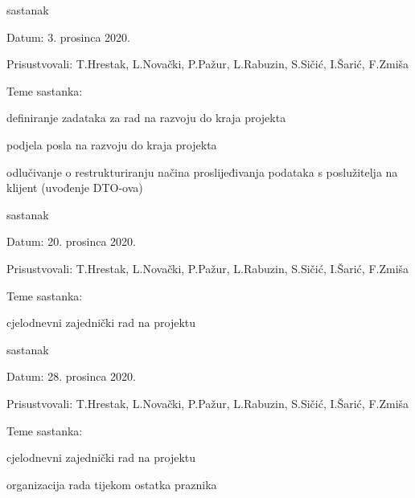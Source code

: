 \begin{packed_enum}
\begin{packed_item}
		
	\end{packed_item}
	
		\item  sastanak
	
	\item[] \begin{packed_item}
		\item Datum: 3. prosinca 2020.
		\item Prisustvovali: T.Hrestak, L.Novački, P.Pažur, L.Rabuzin, S.Sičić, I.Šarić, F.Zmiša
		\item Teme sastanka:
		\begin{packed_item}
			\item  definiranje zadataka za rad na razvoju do kraja projekta
			\item  podjela posla na razvoju do kraja projekta
			\item  odlučivanje o restrukturiranju načina proslijeđivanja podataka s poslužitelja na klijent (uvođenje DTO-ova)
		\end{packed_item}
	\end{packed_item}
	
	\item  sastanak
	
	\item[] \begin{packed_item}
		\item Datum: 20. prosinca 2020.
		\item Prisustvovali: T.Hrestak, L.Novački, P.Pažur, L.Rabuzin, S.Sičić, I.Šarić, F.Zmiša
		\item Teme sastanka:
		\begin{packed_item}
			\item  cjelodnevni zajednički rad na projektu
		\end{packed_item}
	\end{packed_item}
	
	\item  sastanak
	
	\item[] \begin{packed_item}
		\item Datum: 28. prosinca 2020.
		\item Prisustvovali: T.Hrestak, L.Novački, P.Pažur, L.Rabuzin, S.Sičić, I.Šarić, F.Zmiša
		\item Teme sastanka:
		\begin{packed_item}
			\item  cjelodnevni zajednički rad na projektu
			\item  organizacija rada tijekom ostatka praznika
		\end{packed_item}
	\end{packed_item}
	

\end{packed_enum}
